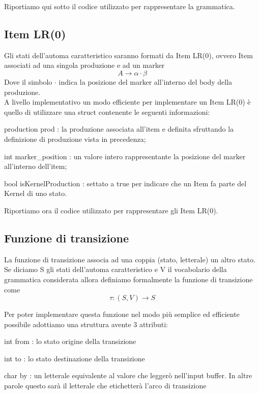 \documentclass[12pt]{article}
\begin{document}
Riportiamo qui sotto il codice utilizzato per rappresentare la grammatica.




\subsection{Item LR(0)}
Gli stati dell'automa caratteristico saranno formati da Item LR(0), ovvero Item associati ad una singola produzione e ad un marker
$$
A \to \alpha\cdot\beta
$$ 
Dove il simbolo $\cdot$ indica la posizione del marker all'interno del body della produzione. \\

A livello implementativo un modo efficiente per implementare un Item LR(0) è quello di utilizzare una struct contenente le seguenti informazioni:
\begin{list}{-}{}
\item production prod : la produzione associata all'item e definita sfruttando la definizione di produzione vista in precedenza;
\item int marker\_position : un valore intero rappresentante la posizione del marker all'interno dell'item;
\item bool isKernelProduction : settato a true per indicare che un Item fa parte del Kernel di uno stato.
\end{list}

Riportiamo ora il codice utilizzato per rappresentare gli Item LR(0).


\subsection{Funzione di transizione}\label{tau}
La funzione di transizione associa ad una coppia (stato, letterale) un altro stato. Se diciamo S gli stati dell'automa caratteristico e V il vocabolario della grammatica considerata allora definiamo formalmente la funzione di transizione come
$$
\tau \colon (S, V) \to S
$$

Per poter implementare questa funzione nel modo più semplice ed efficiente possibile adottiamo una struttura avente 3 attributi:
\begin{list}{-}{}
\item int from : lo stato origine della transizione
\item int to : lo stato destinazione della transizione
\item char by : un letterale equivalente al valore che leggerò nell'input buffer. In altre parole questo sarà il letterale che etichetterà l'arco di transizione 
\end{list}
\end{document}
